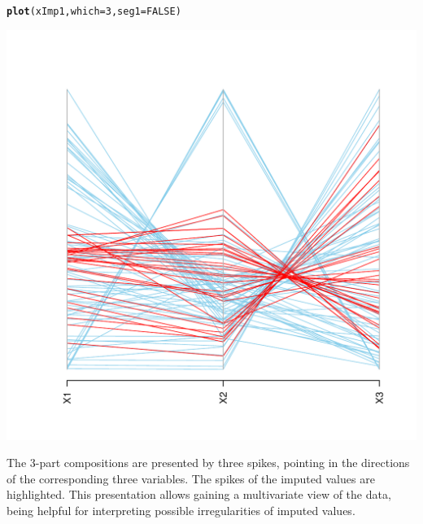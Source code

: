 \documentclass{scrartcl}\usepackage[]{graphicx}\usepackage[]{color}
\makeatletter
\def\maxwidth{ %
  \ifdim\Gin@nat@width>\linewidth
    \linewidth
  \else
    \Gin@nat@width
  \fi
}
\newcommand{\hlnum}[1]{\textcolor[rgb]{0.686,0.059,0.569}{#1}}%
\newcommand{\hlstd}[1]{\textcolor[rgb]{0.345,0.345,0.345}{#1}}%
\newcommand{\hlkwc}[1]{\textcolor[rgb]{0.333,0.667,0.333}{#1}}%
\newcommand{\hlkwd}[1]{\textcolor[rgb]{0.737,0.353,0.396}{\textbf{#1}}}%
\newenvironment{kframe}{%
 \def\at@end@of@kframe{}%
 \ifinner\ifhmode%
  \def\at@end@of@kframe{\end{minipage}}%
  \begin{minipage}{\columnwidth}%
 \fi\fi%
 \def\FrameCommand##1{\hskip\@totalleftmargin \hskip-\fboxsep
 \colorbox{shadecolor}{##1}\hskip-\fboxsep
     \hskip-\linewidth \hskip-\@totalleftmargin \hskip\columnwidth}%
 \MakeFramed {\advance\hsize-\width
   \@totalleftmargin\z@ \linewidth\hsize
   \@setminipage}}%
 {\par\unskip\endMakeFramed%
 \at@end@of@kframe}
\newenvironment{knitrout}{}{} %
\makeatother
\begin{document}
\begin{knitrout}
\color{fgcolor}\begin{kframe}
\begin{alltt}
\hlkwd{plot}\hlstd{(xImp1,} \hlkwc{which}\hlstd{=}\hlnum{3}\hlstd{,} \hlkwc{seg1}\hlstd{=}\hlnum{FALSE}\hlstd{)}
\end{alltt}
\end{kframe}
\includegraphics[width=\maxwidth]{figure/unnamed-chunk-5-1} 

\end{knitrout}

The 3-part compositions are presented by three spikes, pointing in the
 directions of the corresponding three variables. The spikes of
 the imputed values are highlighted. This presentation allows gaining a multivariate
 view of the data, being helpful for interpreting possible irregularities
 of imputed values.

\end{document}
